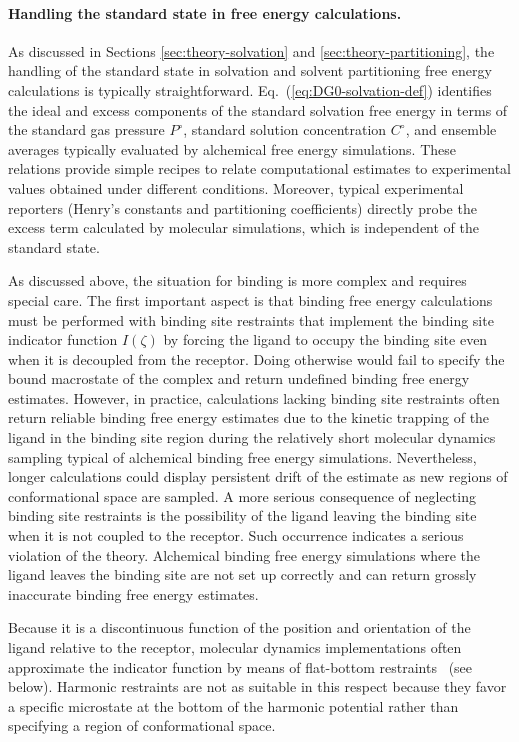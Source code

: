 \documentclass[9pt,bestpractices]{livecoms}
\begin{document}
\paragraph{Handling the standard state in free energy calculations.} \label{sec:ABFE-standard-state}
As discussed in Sections \ref{sec:theory-solvation} and \ref{sec:theory-partitioning}, the handling of the standard state in solvation and solvent partitioning free energy calculations is typically straightforward. Eq.~(\ref{eq:DG0-solvation-def}) identifies the ideal and excess components of the standard solvation free energy in terms of the standard gas pressure $P^\circ$, standard solution concentration $C^\circ$, and ensemble averages typically evaluated by alchemical free energy simulations. These relations provide simple recipes to relate computational estimates to experimental values obtained under different conditions. Moreover, typical experimental reporters (Henry's constants and partitioning coefficients) directly probe the excess term calculated by molecular simulations, which is independent of the standard state.

As discussed above, the situation for binding is more complex and requires special care. The first important aspect is that binding free energy calculations must be performed with binding site restraints that implement the binding site indicator function $I(\zeta)$ by forcing the ligand to occupy the binding site even when it is decoupled from the receptor. Doing otherwise would fail to specify the bound macrostate of the complex and return undefined binding free energy estimates. However, in practice, calculations lacking binding site restraints often return reliable binding free energy estimates due to the kinetic trapping of the ligand in the binding site region during the relatively short molecular dynamics sampling typical of alchemical binding free energy simulations. Nevertheless, longer calculations could display persistent drift of the estimate as new regions of conformational space are sampled. A more serious consequence of neglecting binding site restraints is the possibility of the ligand leaving the binding site when it is not coupled to the receptor. Such occurrence indicates a serious violation of the theory. Alchemical binding free energy simulations where the ligand leaves the binding site are not set up correctly and can return grossly inaccurate binding free energy estimates.

Because it is a discontinuous function of the position and orientation of the ligand relative to the receptor, molecular dynamics implementations often approximate the indicator function by means of flat-bottom restraints~\cite{chen2007can, wu2021alchemical} (see below). Harmonic restraints are not as suitable in this respect because they favor a specific microstate at the bottom of the harmonic potential rather than specifying a region of conformational space.
\end{document}

